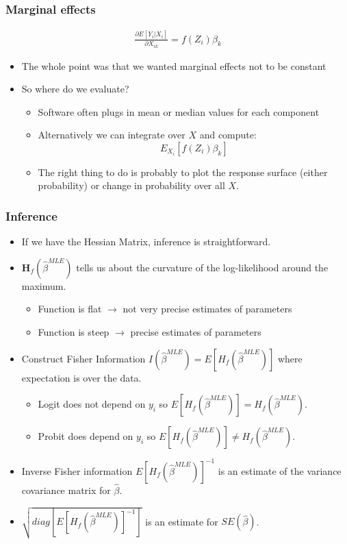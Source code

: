 \begin{frame}
\frametitle{Marginal effects}
\begin{eqnarray*}
\frac{\partial E[Y_i | X_i] }{\partial X_{ik}} = f (Z_i) \beta_k
\end{eqnarray*}
\begin{itemize}
\item The whole point was that we wanted marginal effects not to be constant
\item So where do we evaluate?
\begin{itemize}
\item Software often plugs in mean or median values for each component
\item Alternatively we can integrate over $X$ and compute:
$$
E_{X_i}[ f (Z_i) \beta_k]
$$
\item The right thing to do is probably to plot the response surface (either probability) or change in probability over all $X$.
\end{itemize}
\end{itemize}
\end{frame}

\begin{frame}
\frametitle{Inference}
\begin{itemize} 
\item If we have the Hessian Matrix, inference is straightforward.
\item $\mathbf{H}_f(\hat{\beta}^{MLE})$ tells us about the \alert{curvature} of the log-likelihood around the maximum.
\begin{itemize}
\item Function is flat $\rightarrow$ not very precise estimates of parameters
\item Function is steep $\rightarrow$  precise estimates of parameters
\end{itemize}
\item Construct \alert{Fisher Information} $I(\hat{\beta}^{MLE}) = E[H_f(\hat{\beta}^{MLE})]$ where expectation is over the data.
\begin{itemize}
\item Logit does not depend on $y_i$ so $E[H_f(\hat{\beta}^{MLE})]=H_f(\hat{\beta}^{MLE})$.
\item Probit does depend on $y_i$ so $E[H_f(\hat{\beta}^{MLE})]\neq H_f(\hat{\beta}^{MLE})$.
\end{itemize}
\item Inverse Fisher information $E[H_f(\hat{\beta}^{MLE})]^{-1}$ is an estimate of the variance covariance matrix for $\hat{\beta}$.
\item $\sqrt{diag[E[H_f(\hat{\beta}^{MLE})]^{-1}]}$ is an estimate for $SE(\hat{\beta})$.
\end{itemize}
\end{frame}

